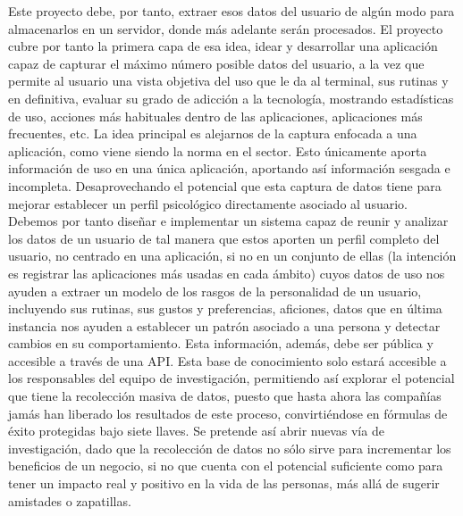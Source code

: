 \documentclass[12pt,a4paper,oneside]{book} %
\begin{document}
\newline \newline
Este proyecto debe, por tanto, extraer esos datos del usuario de algún modo para almacenarlos en un servidor, donde más adelante serán procesados. El proyecto cubre por tanto la primera capa de esa idea, idear y desarrollar una aplicación capaz de capturar el máximo número posible datos del usuario, a la vez que permite al usuario una vista objetiva del uso que le da al terminal, sus rutinas y en definitiva, evaluar su grado de adicción a la tecnología, mostrando estadísticas de uso, acciones más habituales dentro de las aplicaciones, aplicaciones más frecuentes, etc. 
\newline \newline
La idea principal es alejarnos de la captura enfocada a una aplicación, como viene siendo la norma en el sector. Esto únicamente aporta información de uso en una única aplicación, aportando así información sesgada e incompleta. Desaprovechando el potencial que esta captura de datos tiene para mejorar establecer un perfil psicológico directamente asociado al usuario. 
\newline \newline
Debemos por tanto diseñar e implementar un sistema capaz de reunir y analizar los datos de un usuario de tal manera que estos aporten un perfil completo del usuario, no centrado en una aplicación, si no en un conjunto de ellas (la intención es registrar las aplicaciones más usadas en cada ámbito) cuyos datos de uso nos ayuden a extraer un modelo de los rasgos de la personalidad de un usuario, incluyendo sus rutinas, sus gustos y preferencias, aficiones, datos que en última instancia nos ayuden a establecer un patrón asociado a una persona y detectar cambios en su comportamiento. 
\newline \newline
Esta información, además, debe ser pública y accesible a través de una API. Esta base de conocimiento solo estará accesible a los responsables del equipo de investigación, permitiendo así explorar el potencial que tiene la recolección masiva de datos, puesto que hasta ahora las compañías jamás han liberado los resultados de este proceso, convirtiéndose en fórmulas de éxito protegidas bajo siete llaves. 
\newline \newline 
Se pretende así abrir nuevas vía de investigación, dado que la recolección de datos no sólo sirve para incrementar los beneficios de un negocio, si no que cuenta con el potencial suficiente como para tener un impacto real y positivo en la vida de las personas, más allá de sugerir amistades o zapatillas. 
\end{document}
